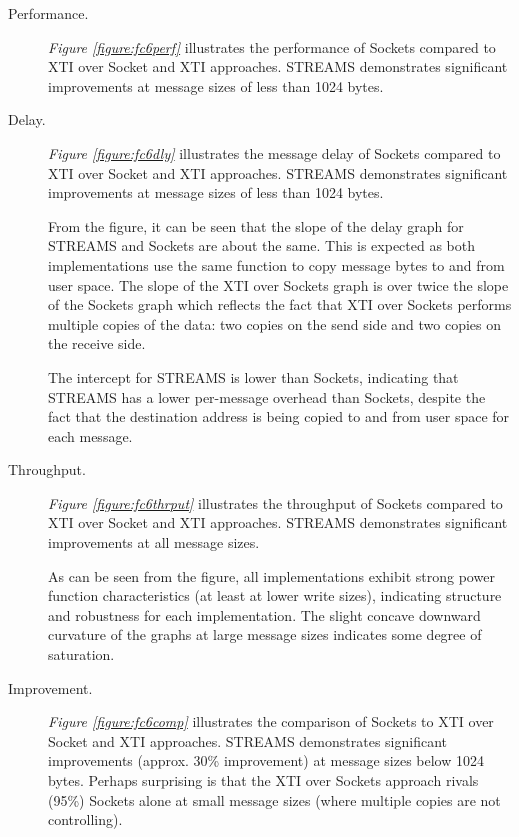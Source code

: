 \documentclass[letterpaper,final,notitlepage,twocolumn,10pt,twoside]{article}
\begin{document}
\begin{description}

\item[Performance.]

\textit{Figure \ref{figure:fc6perf}}
illustrates the performance of Sockets compared to XTI over Socket and XTI
approaches.  STREAMS demonstrates significant improvements at message sizes of
less than 1024 bytes.

\item[Delay.]

\textit{Figure \ref{figure:fc6dly}} illustrates
the message delay of Sockets compared to XTI over Socket and XTI approaches.
STREAMS demonstrates significant improvements at message sizes of less than
1024 bytes.

From the figure, it can be seen that the slope of the delay graph for STREAMS
and Sockets are about the same.  This is expected as both implementations use
the same function to copy message bytes to and from user space.  The slope of
the XTI over Sockets graph is over twice the slope of the Sockets graph which
reflects the fact that XTI over Sockets performs multiple copies of the data:
two copies on the send side and two copies on the receive side.

The intercept for STREAMS is lower than Sockets, indicating that STREAMS has a
lower per-message overhead than Sockets, despite the fact that the destination
address is being copied to and from user space for each message.

\item[Throughput.]

\textit{Figure \ref{figure:fc6thrput}}
illustrates the throughput of Sockets compared to XTI over Socket and XTI
approaches.  STREAMS demonstrates significant improvements at all message
sizes.

As can be seen from the figure, all implementations exhibit strong power
function characteristics (at least at lower write sizes), indicating structure
and robustness for each implementation.  The slight concave downward curvature
of the graphs at large message sizes indicates some degree of saturation.

\item[Improvement.]

\textit{Figure \ref{figure:fc6comp}}
illustrates the comparison of Sockets to XTI over Socket and XTI approaches.
STREAMS demonstrates significant improvements (approx. 30\% improvement) at
message sizes below 1024 bytes.  Perhaps surprising is that the XTI over
Sockets approach rivals (95\%) Sockets alone at small message sizes (where
multiple copies are not controlling).

\end{description}
\end{document}
